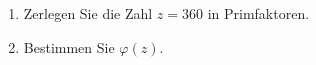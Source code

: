 \begin{aufgabe}[{Klausurvorbereitung 4}]
\begin{enumerate}[label=\alph*)]
\item Zerlegen Sie die Zahl $z = 360$ in Primfaktoren.
\item Bestimmen Sie $\varphi(z)$.
\end{enumerate}
\end{aufgabe}
